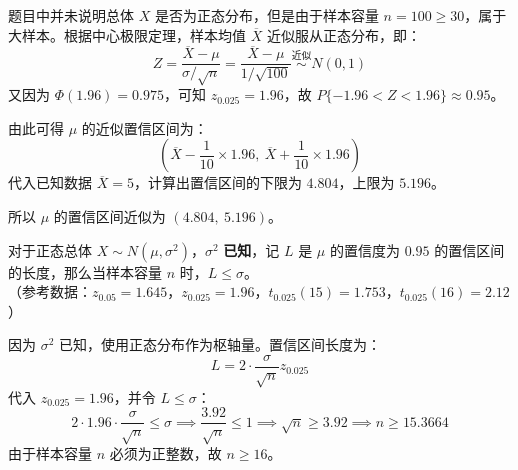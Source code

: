 \documentclass[lang=cn,11pt]{elegantbook}
\begin{document}
\begin{solution}
题目中并未说明总体 $X$ 是否为正态分布，但是由于样本容量 $n=100 \ge 30$，属于大样本。根据中心极限定理，样本均值 $\overline{X}$ 近似服从正态分布，即：
\begin{equation*}
Z = \frac{\overline{X}-\mu}{\sigma/\sqrt{n}} = \frac{\overline{X}-\mu}{1/\sqrt{100}} \stackrel{\text{近似}}{\sim} N(0,1)
\end{equation*}
又因为 $\Phi(1.96)=0.975$，可知 $z_{0.025} = 1.96$，故 $P\{-1.96 < Z < 1.96\} \approx 0.95$。

由此可得 $\mu$ 的近似置信区间为：
\begin{equation*}
\left( \overline{X} - \frac{1}{10} \times 1.96,\ \overline{X} + \frac{1}{10} \times 1.96 \right)
\end{equation*}
代入已知数据 $\overline{X}=5$，计算出置信区间的下限为 $4.804$，上限为 $5.196$。

所以 $\mu$ 的置信区间近似为 $(4.804,\ 5.196)$。
\end{solution}


\begin{exercise} \label{prob:ci_1}
对于正态总体 $X \sim N(\mu, \sigma^2)$，$\sigma^2$ \textbf{已知}，记 $L$ 是 $\mu$ 的置信度为 $0.95$ 的置信区间的长度，那么当样本容量 $n$ \underline{\qquad\qquad} 时，$L \leq \sigma$。\\
（参考数据：$z_{0.05}=1.645$，$z_{0.025}=1.96$，$t_{0.025}(15)=1.753$，$t_{0.025}(16)=2.12$）
\end{exercise}
\begin{solution}
因为 $\sigma^2$ 已知，使用正态分布作为枢轴量。置信区间长度为：
\begin{equation*}
L = 2 \cdot \frac{\sigma}{\sqrt{n}} z_{0.025}
\end{equation*}
代入 $z_{0.025}=1.96$，并令 $L \leq \sigma$：
\begin{equation*}
2 \cdot 1.96 \cdot \frac{\sigma}{\sqrt{n}} \leq \sigma \implies \frac{3.92}{\sqrt{n}} \leq 1 \implies \sqrt{n} \geq 3.92 \implies n \geq 15.3664
\end{equation*}
由于样本容量 $n$ 必须为正整数，故 $n \ge 16$。
\end{solution}
\end{document}
